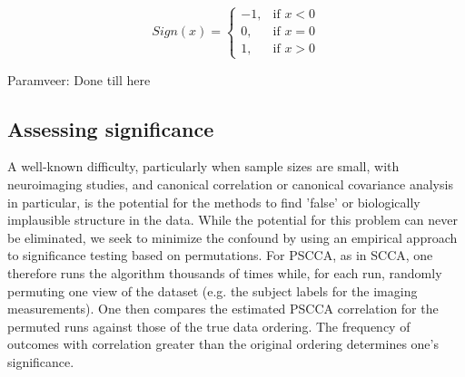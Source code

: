 \documentclass{llncs}
\newcommand{\X}{{\bf X}}
\newcommand{\x}{{\bf x}}
\newcommand{\Y}{{\bf Y}}
\newcommand{\y}{{\bf y}}
\newcommand{\Z}{{\bf Z}}
\begin{document}
 \begin{equation}
Sign(x)= \begin{cases} -1, & \mbox{if } x<0 \\0, & \mbox{if } x=0 \\1, & \mbox{if } x>0 \end{cases}
\end{equation}

 
Paramveer: Done till here
\subsection{Assessing significance}
A well-known difficulty, particularly when sample sizes are small,
with neuroimaging studies, and canonical correlation or canonical
covariance analysis in particular, is the potential for the methods to
find 'false' or biologically implausible structure in the data.  While
the potential for this problem can never be eliminated, we seek to
minimize the confound by using an empirical approach to significance
testing based on permutations.  For PSCCA, as in SCCA, one therefore
runs the algorithm thousands of times while, for each run, randomly
permuting one view of the dataset (e.g. the subject labels for the
imaging measurements).   One then compares the estimated PSCCA
correlation for the permuted runs against those of the true data
ordering.  The frequency of outcomes with correlation greater than the
original ordering determines one's significance.  
\end{document}
